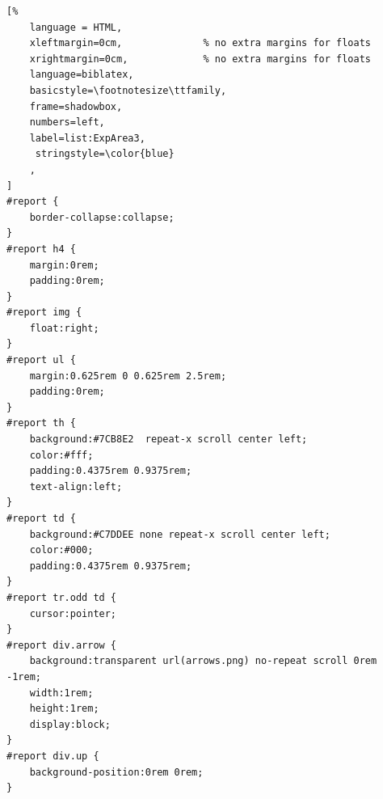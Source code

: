 \begin{lstlisting}[%
    language = HTML,
    xleftmargin=0cm,              % no extra margins for floats
    xrightmargin=0cm,             % no extra margins for floats
    language=biblatex,
    basicstyle=\footnotesize\ttfamily,
    frame=shadowbox,
    numbers=left,
    label=list:ExpArea3,
     stringstyle=\color{blue}
    ,
]
#report {
    border-collapse:collapse;
}
#report h4 {
    margin:0rem;
    padding:0rem;
}
#report img {
    float:right;
}
#report ul {
    margin:0.625rem 0 0.625rem 2.5rem;
    padding:0rem;
}
#report th {
    background:#7CB8E2  repeat-x scroll center left;
    color:#fff;
    padding:0.4375rem 0.9375rem;
    text-align:left;
}
#report td {
    background:#C7DDEE none repeat-x scroll center left;
    color:#000;
    padding:0.4375rem 0.9375rem;
}
#report tr.odd td {
    cursor:pointer;
}
#report div.arrow {
    background:transparent url(arrows.png) no-repeat scroll 0rem -1rem;
    width:1rem;
    height:1rem;
    display:block;
}
#report div.up {
    background-position:0rem 0rem;
}
\end{lstlisting}

